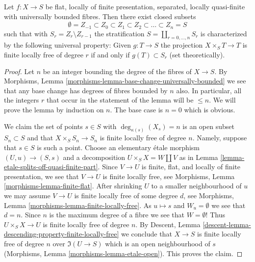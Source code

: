 \begin{lemma}
\label{lemma-stratify-flat-fp-lqf-universally-bounded}
Let $f : X \to S$ be flat, locally of finite presentation, separated,
locally quasi-finite with universally bounded fibres. Then there exist
closed subsets
$$
\emptyset = Z_{-1} \subset Z_0 \subset Z_1 \subset Z_2 \subset
\ldots \subset Z_n = S
$$
such that with $S_r = Z_r \setminus Z_{r - 1}$ the stratification
$S = \coprod_{r = 0, \ldots, n} S_r$ is characterized by the following
universal property: Given $g : T \to S$ the projection
$X \times_S T \to T$ is finite locally
free of degree $r$ if and only if $g(T) \subset S_r$ (set theoretically).
\end{lemma}

\begin{proof}
Let $n$ be an integer bounding the degree of the fibres of $X \to S$.
By Morphisms, Lemma \ref{morphisms-lemma-base-change-universally-bounded}
we see that any base change has degrees of fibres bounded by $n$ also.
In particular, all the integers $r$ that occur in the statement of the lemma
will be $\leq n$. We will prove the lemma by induction on $n$. The base
case is $n = 0$ which is obvious.

\medskip\noindent
We claim the set of points $s \in S$
with $\deg_{\kappa(s)}(X_s) = n$ is an open subset $S_n \subset S$
and that $X \times_S S_n \to S_n$ is finite locally free of degree $n$.
Namely, suppose that $s \in S$ is such a point. Choose an elementary
\'etale morphism $(U, u) \to (S, s)$ and a decomposition
$U \times_S X = W \amalg V$ as in
Lemma \ref{lemma-etale-splits-off-quasi-finite-part}.
Since $V \to U$ is finite, flat, and locally of finite presentation,
we see that $V \to U$ is finite locally free, see
Morphisms, Lemma \ref{morphisms-lemma-finite-flat}.
After shrinking $U$ to a smaller neighbourhood of $u$
we may assume $V \to U$ is finite locally free of some degree $d$, see
Morphisms, Lemma \ref{morphisms-lemma-finite-locally-free}.
As $u \mapsto s$ and $W_u = \emptyset$ we see that $d = n$. Since $n$
is the maximum degree of a fibre we see that $W = \emptyset$!
Thus $U \times_S X \to U$ is finite locally free of degree $n$.
By Descent, Lemma \ref{descent-lemma-descending-property-finite-locally-free}
we conclude that $X \to S$ is finite locally free of degree $n$
over $\Im(U \to S)$ which is an open neighbourhood of $s$
(Morphisms, Lemma \ref{morphisms-lemma-etale-open}).
This proves the claim.


\end{proof}
